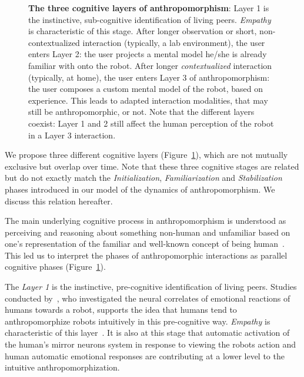 \documentclass{frontiersSCNS} %
\begin{document}
\begin{figure}[htb]
\begin{tikzpicture}
\end{tikzpicture}
\caption{\textbf{The three cognitive layers of anthropomorphism}: Layer 1 is the instinctive,
sub-cognitive identification of living peers. {\it Empathy} is characteristic
of this stage. After longer observation or short, non-contextualized interaction
(typically, a lab environment), the user enters Layer 2: the user projects a
mental model he/she is already familiar with onto the robot. After longer {\it
contextualized} interaction (typically, at home), the user enters Layer 3 of
anthropomorphism: the user composes a custom mental model of the robot,
based on experience. This leads to adapted interaction modalities, that may
still be anthropomorphic, or not. Note that the different layers coexist: Layer
1 and 2 still affect the human perception of the robot in a Layer 3 interaction.}
\label{fig:cognitivemodel}
\end{figure}

We propose three different cognitive layers (Figure~\ref{fig:cognitivemodel}),
which are not mutually exclusive but overlap over time. Note that these three
cognitive stages are related but do not exactly match the \emph{Initialization},
\emph{Familiarization} and \emph{Stabilization} phases introduced in our model
of the dynamics of anthropomorphism. We discuss this relation hereafter.

The main underlying cognitive process in anthropomorphism is understood as
perceiving and reasoning about something non-human and unfamiliar based on one's
representation of the familiar and well-known concept of being
human~\citep{epley_when_2008}. This led us to interpret the phases of
anthropomorphic interactions as parallel cognitive phases
(Figure~\ref{fig:cognitivemodel}).

The \emph{Layer 1} is the instinctive, pre-cognitive identification of living
peers. Studies conducted by~\citet{rosenthal-vonderputten_experimental_2013},
who investigated the neural correlates of emotional reactions of humans towards
a robot, supports the idea that humans tend to anthropomorphize robots
intuitively in this pre-cognitive way. {\it Empathy} is characteristic of this
layer~\citep{rosenthalvonderPutten2013neural}.  It is also at this stage that
automatic activation of the human's mirror neurons system  in response to
viewing the robots action and human automatic emotional responses are
contributing at a lower level to the intuitive anthropomorphization.
\end{document}

